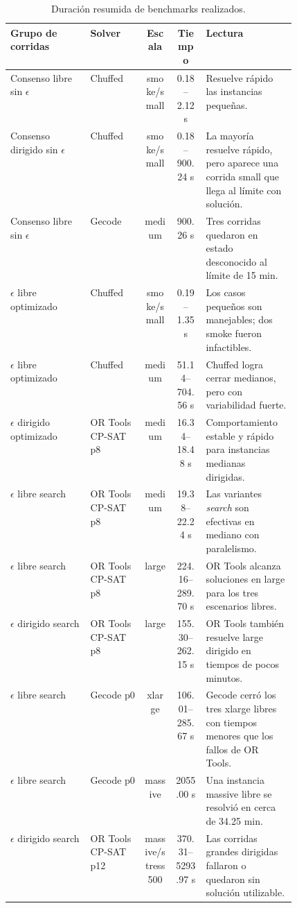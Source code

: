 \documentclass[10pt,letterpaper]{article}
\begin{document}
\begin{table}[H]
\centering
\scriptsize
\caption{Duraci\'on resumida de benchmarks realizados.}
\label{tab:duracion-benchmarks}
\renewcommand{\arraystretch}{1.18}
\begin{tabularx}{\linewidth}{p{0.29\linewidth} p{0.19\linewidth} c c Y}
\toprule
\textbf{Grupo de corridas} & \textbf{Solver} & \textbf{Escala} & \textbf{Tiempo} & \textbf{Lectura} \\
\midrule
Consenso libre sin \(\epsilon\) & Chuffed & smoke/small & 0.18--2.12 s & Resuelve r\'apido las instancias peque\~nas. \\
Consenso dirigido sin \(\epsilon\) & Chuffed & smoke/small & 0.18--900.24 s & La mayor\'ia resuelve r\'apido, pero aparece una corrida small que llega al l\'imite con soluci\'on. \\
Consenso libre sin \(\epsilon\) & Gecode & medium & 900.26 s & Tres corridas quedaron en estado desconocido al l\'imite de 15 min. \\
\(\epsilon\) libre optimizado & Chuffed & smoke/small & 0.19--1.35 s & Los casos peque\~nos son manejables; dos smoke fueron infactibles. \\
\(\epsilon\) libre optimizado & Chuffed & medium & 51.14--704.56 s & Chuffed logra cerrar medianos, pero con variabilidad fuerte. \\
\(\epsilon\) dirigido optimizado & OR Tools CP-SAT p8 & medium & 16.34--18.48 s & Comportamiento estable y r\'apido para instancias medianas dirigidas. \\
\(\epsilon\) libre search & OR Tools CP-SAT p8 & medium & 19.38--22.24 s & Las variantes \textit{search} son efectivas en mediano con paralelismo. \\
\(\epsilon\) libre search & OR Tools CP-SAT p8 & large & 224.16--289.70 s & OR Tools alcanza soluciones en large para los tres escenarios libres. \\
\(\epsilon\) dirigido search & OR Tools CP-SAT p8 & large & 155.30--262.15 s & OR Tools tambi\'en resuelve large dirigido en tiempos de pocos minutos. \\
\(\epsilon\) libre search & Gecode p0 & xlarge & 106.01--285.67 s & Gecode cerr\'o los tres xlarge libres con tiempos menores que los fallos de OR Tools. \\
\(\epsilon\) libre search & Gecode p0 & massive & 2055.00 s & Una instancia massive libre se resolvi\'o en cerca de 34.25 min. \\
\(\epsilon\) dirigido search & OR Tools CP-SAT p12 & massive/stress500 & 370.31--5293.97 s & Las corridas grandes dirigidas fallaron o quedaron sin soluci\'on utilizable. \\
\bottomrule
\end{tabularx}
\renewcommand{\arraystretch}{1.0}
\end{table}
\end{document}

